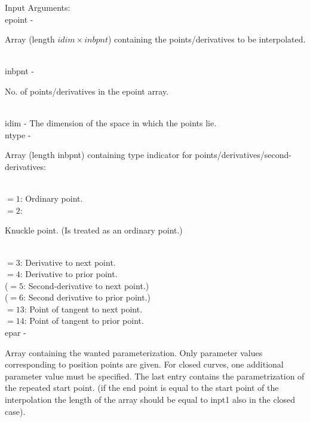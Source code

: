         \>Input Arguments:\\
        \>\>    {\fov epoint}\> - \>
        \begin{minipg2}
          Array (length $idim\times inbpnt$) containing the
          points/\-derivatives to be interpolated.
        \end{minipg2}\\
        \>\>    {\fov inbpnt}\> - \>
        \begin{minipg2}
          No. of points/\-derivatives in the {\fov epoint} array.
        \end{minipg2}\\
        \>\>    {\fov idim}\> - \>
        The dimension of the space in which the points lie.\\
        \>\>    {\fov ntype}\> - \> \begin{minipg2}
                  Array (length {\fov inbpnt}) containing type indicator for
                  points/\-derivatives/\-second-derivatives:
                \end{minipg2}\\
                \>\>\>\> $=1$\>: Ordinary point.\\
                \>\>\>\> $=2$\>:
                \begin{minipg5}
                  Knuckle point.  (Is treated as an ordinary point.)
                \end{minipg5}\\
                \>\>\>\> $=3$\>: Derivative to next point.\\
                \>\>\>\> $=4$\>: Derivative to prior point.\\
                \>\>\>\> ($=5$\>: Second-derivative to next point.)\\
                \>\>\>\> ($=6$\>: Second derivative to prior point.)\\
                \>\>\>\> $=13$\>: Point of tangent to next point.\\
                \>\>\>\> $=14$\>: Point of tangent to prior  point.\\
        \>\>    {\fov epar}\> - \>
        \begin{minipg2}
          Array containing the wanted parameterization. Only parameter
          values corresponding to position points are given.
          For closed curves, one additional parameter value
          must be specified. The last entry contains
          the parametrization of the repeated start point.
          (if the end point is equal to the start point of
          the interpolation the length of the array should
          be equal to inpt1 also in the closed case).
        \end{minipg2}\\
